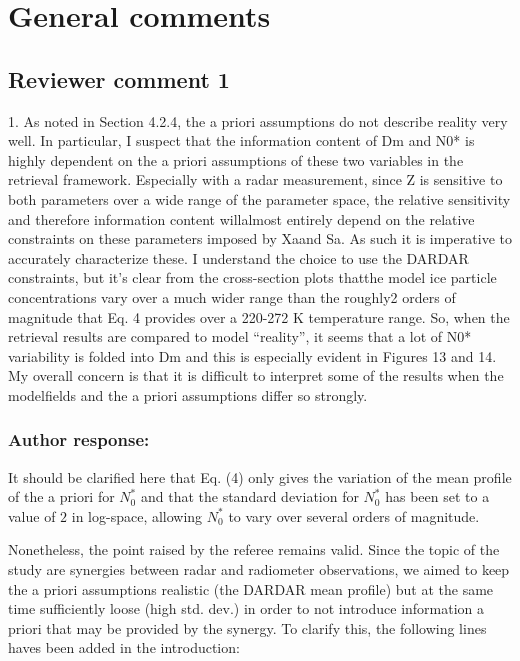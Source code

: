 \documentclass[11pt]{scrartcl}
\author{simon}
\date{\today}
\title{}
\begin{document}
\setlength{\parindent}{0cm}

\section{General comments}

\subsection*{Reviewer comment 1}

1. As noted in Section 4.2.4, the a priori assumptions do not describe reality
very well. In particular, I suspect that the information content of Dm and N0* is
highly dependent on the a priori assumptions of these two variables in the
retrieval framework. Especially with a radar measurement, since Z is sensitive to
both parameters over a wide range of the parameter space, the relative
sensitivity and therefore information content willalmost entirely depend on the
relative constraints on these parameters imposed by Xaand Sa. As such it is
imperative to accurately characterize these. I understand the choice to use the
DARDAR constraints, but it’s clear from the cross-section plots thatthe model
ice particle concentrations vary over a much wider range than the roughly2
orders of magnitude that Eq. 4 provides over a 220-272 K temperature range.
So, when the retrieval results are compared to model “reality”, it seems that a
lot of N0* variability is folded into Dm and this is especially evident in
Figures 13 and 14. My overall concern is that it is difficult to interpret some
of the results when the modelfields and the a priori assumptions differ so
strongly.

\subsubsection*{Author response:}

It should be clarified here that Eq. (4) only gives the variation of the mean
profile of the a priori for $N_0^*$ and that the standard deviation for $N_0^*$
has been set to a value of $2$ in log-space, allowing $N_0^*$ to vary over several
orders of magnitude.

Nonetheless, the point raised by the referee remains valid. Since the topic
of the study are synergies between radar and radiometer observations, we aimed
to keep the a priori assumptions realistic (the DARDAR mean profile) but at the
same time sufficiently loose (high std. dev.) in order to not introduce information
a priori that may be provided by the synergy. To clarify this, the following
lines haves been added in the introduction:
\end{document}
